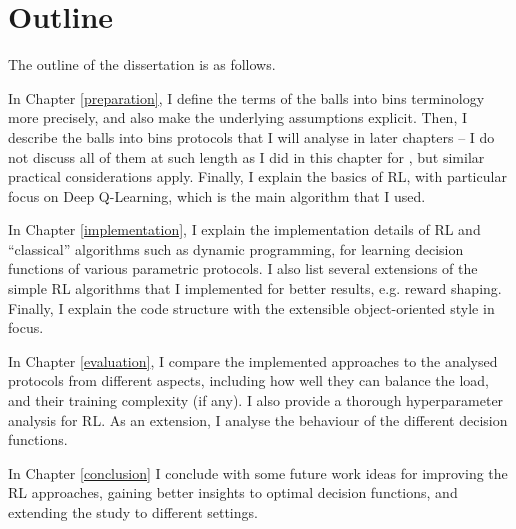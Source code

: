 

\section{Outline}

The outline of the dissertation is as follows.


In Chapter \ref{preparation}, I define the terms of the balls into bins terminology more precisely, and also make the underlying assumptions explicit. Then, I describe the balls into bins protocols that I will analyse in later chapters -- I do not discuss all of them at such length as I did in this chapter for \TwoThinning, but similar practical considerations apply. Finally, I explain the basics of RL, with particular focus on Deep Q-Learning, which is the main algorithm that I used.


In Chapter \ref{implementation}, I explain the implementation details of RL and ``classical'' algorithms such as dynamic programming, for learning decision functions of various parametric protocols. I also list several extensions of the simple RL algorithms that I implemented for better results, e.g. reward shaping. Finally, I explain the code structure with the extensible object-oriented style in focus.


In Chapter \ref{evaluation}, I compare the implemented approaches to the analysed protocols from different aspects, including how well they can balance the load, and their training complexity (if any). I also provide a thorough hyperparameter analysis for RL. As an extension, I analyse the behaviour of the different decision functions. 


In Chapter \ref{conclusion} I conclude with some future work ideas for improving the RL approaches, gaining better insights to optimal decision functions, and extending the study to different settings.